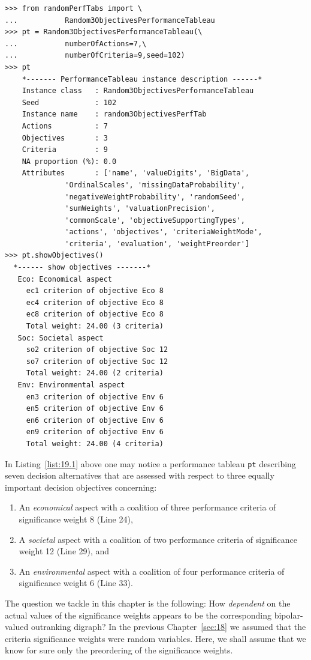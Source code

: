 \begin{lstlisting}[caption={Generate a Random 3 Objectives Performance Tableau},label=list:19.1]
>>> from randomPerfTabs import \
...           Random3ObjectivesPerformanceTableau
>>> pt = Random3ObjectivesPerformanceTableau(\
...           numberOfActions=7,\
...           numberOfCriteria=9,seed=102)
>>> pt
    *------- PerformanceTableau instance description ------*
    Instance class   : Random3ObjectivesPerformanceTableau
    Seed             : 102
    Instance name    : random3ObjectivesPerfTab
    Actions          : 7
    Objectives       : 3
    Criteria         : 9
    NA proportion (%): 0.0
    Attributes       : ['name', 'valueDigits', 'BigData',
              'OrdinalScales', 'missingDataProbability',
              'negativeWeightProbability', 'randomSeed',
              'sumWeights', 'valuationPrecision',
              'commonScale', 'objectiveSupportingTypes',
              'actions', 'objectives', 'criteriaWeightMode',
              'criteria', 'evaluation', 'weightPreorder']
>>> pt.showObjectives()
  *------ show objectives -------*
   Eco: Economical aspect
     ec1 criterion of objective Eco 8
     ec4 criterion of objective Eco 8
     ec8 criterion of objective Eco 8
     Total weight: 24.00 (3 criteria)
   Soc: Societal aspect
     so2 criterion of objective Soc 12
     so7 criterion of objective Soc 12
     Total weight: 24.00 (2 criteria)
   Env: Environmental aspect
     en3 criterion of objective Env 6
     en5 criterion of objective Env 6
     en6 criterion of objective Env 6
     en9 criterion of objective Env 6
     Total weight: 24.00 (4 criteria)
\end{lstlisting}

In Listing~\ref{list:19.1} above one may notice a performance tableau \texttt{pt} describing seven decision alternatives that are assessed with respect to three equally important decision objectives concerning:
\begin{enumerate}[topsep=1pt]
\item An \emph{economical} aspect with a coalition of three performance criteria of significance weight 8 (Line 24),
\item A \emph{societal} aspect with a coalition of two performance criteria of significance weight 12 (Line 29), and
\item An \emph{environmental} aspect with a coalition of four performance criteria of significance weight 6 (Line 33).
\end{enumerate}

The question we tackle in this chapter is the following: How \emph{dependent} on the actual values of the significance weights appears to be the corresponding bipolar-valued outranking digraph? In the previous Chapter~\ref{sec:18} we assumed that the criteria significance weights were random variables. Here, we shall assume that we know for sure only the preordering of the significance weights.

